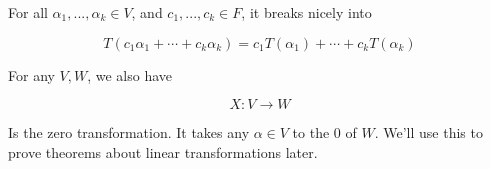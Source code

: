 \documentclass[12pt]{article}
\begin{document}
  For all $\alpha_1,..., \alpha_k \in V$,  and $c_1, ..., c_k \in F$, it
  breaks nicely into

  \[
    T(c_1 \alpha_1 + \cdots + c_k \alpha_k) = c_1 T(\alpha_1) + \cdots + c_k
    T(\alpha_k)
  \]


  For any $V, W$, we also have

  \[
    X: V \to W
  \]

  Is the zero transformation. It takes any $\alpha \in V$ to the $0$ of $W$.
  We'll use this to prove theorems about linear transformations later.
\end{document}
